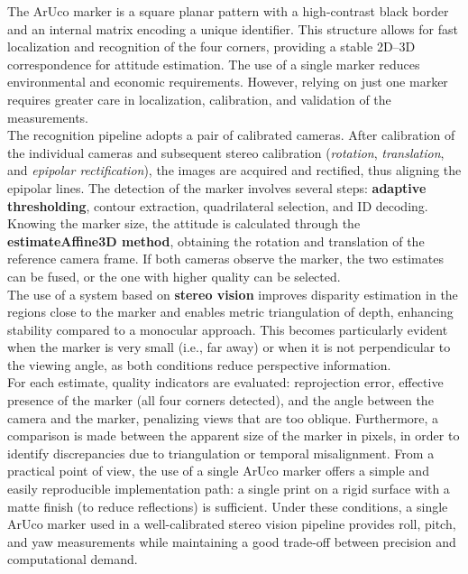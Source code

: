 The ArUco marker is a square planar pattern with a high-contrast black border and an internal matrix encoding a unique identifier. This structure allows for fast localization and recognition of the four corners, providing a stable 2D--3D correspondence for attitude estimation. The use of a single marker reduces environmental and economic requirements. However, relying on just one marker requires greater care in localization, calibration, and validation of the measurements.
\\The recognition pipeline adopts a pair of calibrated cameras. After calibration of the individual cameras and subsequent stereo calibration (\textit{rotation}, \textit{translation}, and \textit{epipolar rectification}), the images are acquired and rectified, thus aligning the epipolar lines. The detection of the marker involves several steps: \textbf{adaptive thresholding}, contour extraction, quadrilateral selection, and ID decoding.
\\Knowing the marker size, the attitude is calculated through the \textbf{estimateAffine3D method}, obtaining the rotation and translation of the reference camera frame. If both cameras observe the marker, the two estimates can be fused, or the one with higher quality can be selected.
\\The use of a system based on \textbf{stereo vision} improves disparity estimation in the regions close to the marker and enables metric triangulation of depth, enhancing stability compared to a monocular approach. This becomes particularly evident when the marker is very small (i.e., far away) or when it is not perpendicular to the viewing angle, as both conditions reduce perspective information.
\\For each estimate, quality indicators are evaluated: reprojection error, effective presence of the marker (all four corners detected), and the angle between the camera and the marker, penalizing views that are too oblique. Furthermore, a comparison is made between the apparent size of the marker in pixels, in order to identify discrepancies due to triangulation or temporal misalignment.
From a practical point of view, the use of a single ArUco marker\cite{aruco_pose} offers a simple and easily reproducible implementation path: a single print on a rigid surface with a matte finish (to reduce reflections) is sufficient. Under these conditions, a single ArUco marker used in a well-calibrated stereo vision pipeline provides roll, pitch, and yaw measurements while maintaining a good trade-off between precision and computational demand.
